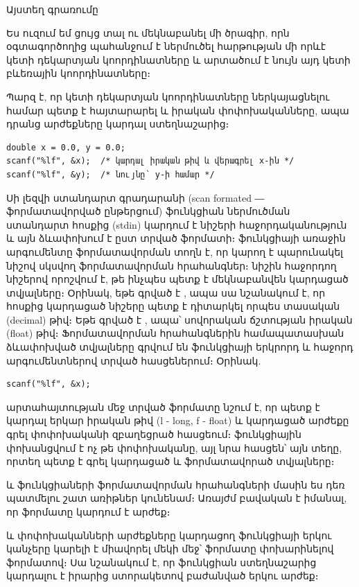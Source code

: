 Այստեղ  գրառումը

Ես ուզում եմ ցույց տալ ու մեկնաբանել մի ծրագիր, որն օգտագործողից
պահանջում է ներմուծել հարթության մի որևէ կետի դեկարտյան կոորդինատները և
արտածում է նույն այդ կետի բևեռային կոորդինատները։

Պարզ է, որ կետի դեկարտյան կոորդինատները ներկայացնելու համար պետք է
հայտարարել  և  իրական փոփոխականները, ապա դրանց
արժեքները կարդալ ստեղնաշարից։

\begin{Verbatim}
double x = 0.0, y = 0.0;
scanf("%lf", &x);  /* կարդալ իրական թիվ և վերագրել x-ին */
scanf("%lf", &y);  /* նույնը՝ y-ի համար */
\end{Verbatim}

Սի լեզվի ստանդարտ գրադարանի  (scan formated
― ֆորմատավորված ընթերցում) ֆունկցիան ներմուծման ստանդարտ հոսքից (stdin)
կարդում է նիշերի հաջորդականություն և այն ձևափոխում է ըստ տրված ֆորմատի։
 ֆունկցիայի առաջին արգումենտը ֆորմատավորման տողն է, որ
կարող է պարունակել \code{\%} նիշով սկսվող ֆորմատավորման հրահանգներ։
\code{\%} նիշին հաջորդող նիշերով որոշվում է, թե ինչպես պետք է
մեկնաբանվեն կարդացած տվյալները։ Օրինակ, եթե գրված է , ապա
սա նշանակում է, որ հոսքից կարդացած նիշերը պետք է դիտարկել որպես
տասական (decimal) թիվ։ Եթե գրված է , ապա՝ սովորական ճշտության
իրական (float) թիվ։ Ֆորմատավորման հրահանգներին համապատասխան ձևափոխված
տվյալները գրվում են  ֆունկցիայի երկրորդ և հաջորդ արգումենտներով
տրված հասցեներում։ Օրինակ.

\begin{Verbatim}
scanf("%lf", &x);
\end{Verbatim}

արտահայտության մեջ տրված  ֆորմատը նշում է, որ պետք է
կարդալ երկար իրական թիվ (l - long, f - float) և կարդացած արժեքը գրել
 փոփոխականի զբաղեցրած հասցեում։  ֆունկցիային
փոխանցվում է ոչ թե փոփոխականը, այլ նրա հասցեն՝ այն տեղը, որտեղ պետք է
գրել կարդացած և ֆորմատավորած տվյալները։

 և  ֆունկցիաների ֆորմատավորման հրահանգների
մասին ես դեռ պատմելու շատ առիթներ կունենամ։ Առայժմ բավական է իմանալ, որ
 ֆորմատը կարդում է  արժեք։

 և  փոփոխականների արժեքները կարդացող 
ֆունկցիայի երկու կանչերը կարելի է միավորել մեկի մեջ՝ 
ֆորմատը փոխարինելով  ֆորմատով։ Սա նշանակում է, որ
 ֆունկցիան ստեղնաշարից կարդալու է իրարից ստորակետով
բաժանված երկու  արժեք։

